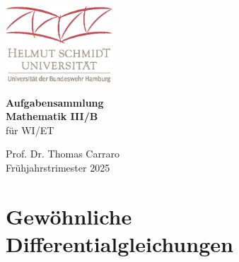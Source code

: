 \documentclass[a4paper,12pt]{scrartcl}
\newcounter{Aufg}
\begin{document}
\thispagestyle{empty} 
\begin{center}
    \vspace*{2cm}
    \includegraphics[width=0.3\textwidth]{HSU_RGB.eps} %
\end{center}

\begin{center}
    \vspace{1cm}
    {\LARGE \textbf{Aufgabensammlung}}\\
    \vspace{0.5cm}
    {\LARGE \textbf{Mathematik III/B}} \\
    \vspace{0.5cm}
    {\large f\"ur WI/ET} \\
\end{center}


\vfill
\begin{center}
    {\large Prof. Dr. Thomas Carraro} \\
    {\large Fr\"uhjahrstrimester 2025}
\end{center}

\newpage

\section*{Gew\"ohnliche Differentialgleichungen}



%
\end{document}
